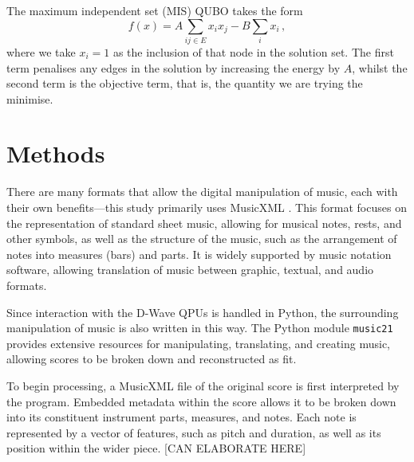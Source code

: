 \documentclass[aps,pra,10pt,twocolumn]{revtex4-2}
\begin{document}
The maximum independent set (MIS) QUBO takes the form
\begin{equation}
    f(x)=A\sum_{ij\in E}x_ix_j-B\sum_i x_i\,,
    \label{eq:MIS}
\end{equation}
where we take $x_i=1$ as the inclusion of that node in the solution set. The first term penalises any edges in the solution by increasing the energy by $A$, whilst the second term is the objective term, that is, the quantity we are trying the minimise.








\newpage
\section{Methods}

There are many formats that allow the digital manipulation of music, each with their own benefits—this study primarily uses MusicXML \cite{musicxml}. This format focuses on the representation of standard sheet music, allowing for musical notes, rests, and other symbols, as well as the structure of the music, such as the arrangement of notes into measures (bars) and parts. It is widely supported by music notation software, allowing translation of music between graphic, textual, and audio formats.

Since interaction with the D-Wave QPUs is handled in Python, the surrounding manipulation of music is also written in this way. The Python module \verb|music21| provides extensive resources for manipulating, translating, and creating music, allowing scores to be broken down and reconstructed as fit.

To begin processing, a MusicXML file of the original score is first interpreted by the program. Embedded metadata within the score allows it to be broken down into its constituent instrument parts, measures, and notes. Each note is represented by a vector of features, such as pitch and duration, as well as its position within the wider piece. [CAN ELABORATE HERE]
\end{document}
